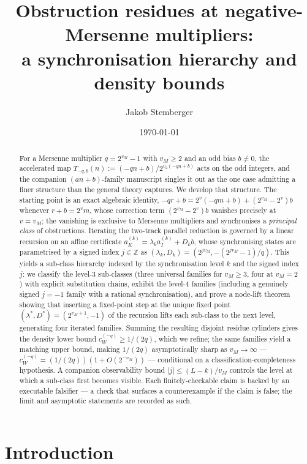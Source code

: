 \documentclass[11pt,reqno]{amsart}
\title[Obstruction residues at negative-Mersenne multipliers]{Obstruction
  residues at negative-Mersenne multipliers:\\
  a synchronisation hierarchy and density bounds}
\author{Jakob Stemberger}
\date{\today}
\theoremstyle{plain}
\theoremstyle{definition}
\theoremstyle{remark}
\newcommand{\Tnegq}{T_{-q,b}}
\newcommand{\Z}{\mathbb{Z}}
\newcommand{\aK}{a_{K}}
\newcommand{\aI}{a_{I}}
\newcommand{\vtwo}{v_{2}}
\newcommand{\vM}{v_{M}}
\newcommand{\cWq}{c_{W}^{(-q)}}
\begin{document}
\begin{abstract}
For a Mersenne multiplier $q = 2^{\vM} - 1$ with $\vM \ge 2$ and an odd
bias $b \ne 0$, the accelerated map $\Tnegq(n) := (-qn + b)/2^{\vtwo(-qn+b)}$
acts on the odd integers, and the companion $(an+b)$-family manuscript
singles it out as the one case admitting a finer structure than the general
theory captures. We develop that structure. The starting point is an exact
algebraic identity, $-q r + b = 2^v(-q m + b) + (2^{\vM} - 2^v) b$ whenever
$r + b = 2^v m$, whose correction term $(2^{\vM} - 2^v) b$ vanishes precisely
at $v = \vM$; the vanishing is exclusive to Mersenne multipliers and
synchronises a \emph{principal class} of obstructions. Iterating the
two-track parallel reduction is governed by a linear recursion on an affine
certificate $\aK^{(k)} = \lambda_k \aI^{(k)} + D_k b$, whose synchronising
states are parametrised by a signed index $j \in \Z$ as
$(\lambda_k, D_k) = (2^{j\vM}, -(2^{j\vM}-1)/q)$. This yields a sub-class
hierarchy indexed by the synchronisation level $k$ and the signed index $j$:
we classify the level-$3$ sub-classes (three universal families for
$\vM \ge 3$, four at $\vM = 2$) with explicit substitution chains, exhibit
the level-$4$ families (including a genuinely signed $j = -1$ family with
a rational synchronisation), and prove a node-lift theorem showing that
inserting a fixed-point step at the unique fixed point
$(\lambda^*, D^*) = (2^{\vM+1}, -1)$ of the recursion lifts each sub-class to
the next level, generating four iterated families. Summing the resulting
disjoint residue cylinders gives the density lower bound
$\cWq \ge 1/(2q)$, which we refine; the same families yield a matching upper
bound, making $1/(2q)$ asymptotically sharp as $\vM \to \infty$ ---
$\cWq = (1/(2q))(1 + O(2^{-\vM}))$ --- conditional on a
classification-completeness hypothesis. A companion
observability bound $\lvert j \rvert \le (L - k)/\vM$ controls the level at
which a sub-class first becomes visible. Each finitely-checkable claim is
backed by an executable falsifier --- a check that surfaces a counterexample
if the claim is false; the limit and asymptotic statements are
recorded as such.
\end{abstract}

\maketitle

\section{Introduction}\label{sec:intro}
\end{document}
